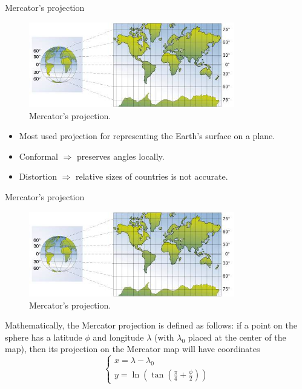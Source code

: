 \documentclass[10pt]{beamer}
\begin{document}
\begin{frame}{Mercator's projection}
  \begin{figure}[H]
    \centering
    \includegraphics[width=0.8\textwidth]{images/mercator.jpg}
    \caption{Mercator's projection.}
\end{figure}

\begin{itemize}
  \item Most used projection for representing the Earth's surface on a plane.
  \item Conformal $\Longrightarrow$ preserves angles locally.
  \item Distortion $\Longrightarrow$ relative sizes of countries is not accurate.
\end{itemize}
\end{frame}

\begin{frame}{Mercator's projection}
  \begin{figure}[H]
    \centering
    \includegraphics[width=0.8\textwidth]{images/mercator.jpg}
    \caption{Mercator's projection.}
\end{figure}
Mathematically, the Mercator projection is defined as follows: if a point on 
the sphere has a latitude $\phi$ and longitude $\lambda$ (with $\lambda_{0}$ 
placed at the center of the map), then its projection on the Mercator map will 
have coordinates 
\begin{equation}
  \left\{
  \begin{array}{l}
      x =  \lambda - \lambda_{0} \\
      y =  \ln(\tan(\frac{\pi}{4} + \frac{\phi}{2}))
  \end{array}
  \right.
\end{equation}
\end{frame}
\end{document}
